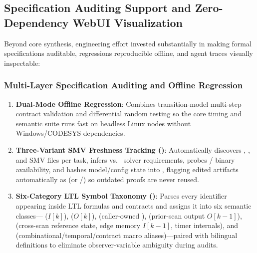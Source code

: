 \subsection{Specification Auditing Support and Zero-Dependency WebUI Visualization}
Beyond core synthesis, engineering effort invested substantially in making formal specifications auditable, regressions reproducible offline, and agent traces visually inspectable:

\subsubsection{Multi-Layer Specification Auditing and Offline Regression}
\begin{enumerate}
  \item \textbf{ Dual-Mode Offline Regression}: Combines transition-model multi-step contract validation and differential random testing so the core timing and semantic suite runs fast on headless Linux nodes without Windows/CODESYS dependencies.
  \item \textbf{Three-Variant SMV Freshness Tracking ()}: Automatically discovers , , and  SMV files per task, infers  vs.\  solver requirements, probes / binary availability, and hashes model/config state into , flagging edited artifacts automatically as  (or /) so outdated proofs are never reused.
  \item \textbf{Six-Category LTL Symbol Taxonomy ()}: Parses every identifier appearing inside LTL formulas and contracts and assigns it into six semantic classes--- ($I[k]$),  ($O[k]$),  (caller-owned ),  (prior-scan output $O[k-1]$),  (cross-scan reference state, edge memory $I[k-1]$, timer internals), and  (combinational/temporal/contract macro aliases)---paired with bilingual definitions to eliminate observer-variable ambiguity during audits.
\end{enumerate}


